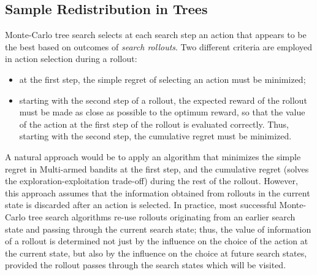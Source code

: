 \documentclass{article}
\begin{document}
\subsection{Sample Redistribution in Trees}
\label{sec:control-redistribution}

Monte-Carlo tree search \cite{Chaslot.montecarlo} selects at each
search step an action that appears to be the best based on outcomes
of \textit{search rollouts}. Two different criteria are employed in
action selection during a rollout:
\begin{itemize}
\item at the first step, the simple regret of selecting an action
must be minimized;
\item starting with the second step of a rollout, the expected reward
of the rollout
 must be made as close as possible to the optimum reward, so that the
 value of the action at the first step of the rollout is evaluated
 correctly. Thus, starting with the second step, the cumulative regret
 must be minimized.
\end{itemize}

A natural approach would be to apply an algorithm that minimizes the
simple regret in Multi-armed bandits at the first step, and the
cumulative regret (solves the exploration-exploitation trade-off)
during the rest of the rollout.  However, this approach assumes that
the information obtained from rollouts in the current state is
discarded after an action is selected. In practice, most successful
Monte-Carlo tree search algorithms re-use rollouts originating from an
earlier search state and passing through the current search state;
thus, the value of information of a rollout is determined not just by
the influence on the choice of the action at the current state, but
also by the influence on the choice at future search states, provided
the rollout passes through the search states which will be visited.
\end{document}
